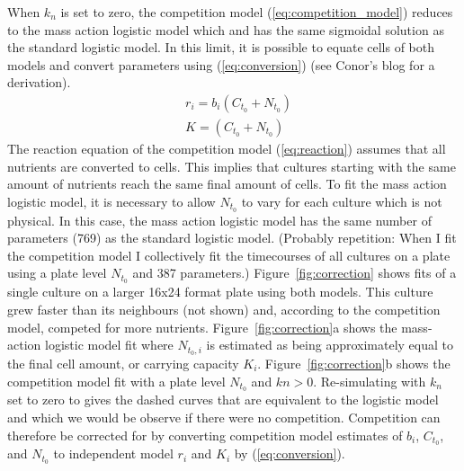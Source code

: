 When \(k_{n}\) is set to zero, the competition model
(\ref{eq:competition_model}) reduces to the mass action logistic model
which and has the same sigmoidal solution as the standard logistic
model. In this limit, it is possible to equate cells of both models
and convert parameters using (\ref{eq:conversion}) (see
Conor's blog for a derivation).
\begin{subequations}
  \label{eq:conversion}
  \begin{align}
    &r_{i} = b_{i}(C_{t_{0}} + N_{t_{0}})\\
    &K = (C_{t_{0}} + N_{t_{0}})
  \end{align}
\end{subequations}
%
The reaction equation of the competition model (\ref{eq:reaction})
assumes that all nutrients are converted to cells. This implies that
cultures starting with the same amount of nutrients reach the same
final amount of cells. To fit the mass action logistic model, it is
necessary to allow \(N_{t_{0}}\) to vary for each culture which is not
physical. In this case, the mass action logistic model has the same
number of parameters (769) as the standard logistic model. (Probably
repetition: When I fit the competition model I collectively fit the
timecourses of all cultures on a plate using a plate level
\(N_{t_{0}}\) and 387 parameters.)
%
Figure~\ref{fig:correction} shows fits of a single culture on a larger
16x24 format plate using both models. This culture grew faster than
its neighbours (not shown) and, according to the competition model,
competed for more nutrients.
%
Figure~\ref{fig:correction}a shows the mass-action logistic model fit
where \(N_{t_{0},i}\) is estimated as being approximately equal to the
final cell amount, or carrying capacity \(K_{i}\).
%
Figure~\ref{fig:correction}b shows the competition model fit with a
plate level \(N_{t_{0}}\) and \(kn > 0\). Re-simulating with \(k_{n}\)
set to zero to gives the dashed curves that are equivalent to the
logistic model and which we would be observe if there were no
competition. Competition can therefore be corrected for by converting
competition model estimates of \(b_{i}\), \(C_{t_{0}}\), and
\(N_{t_{0}}\) to independent model \(r_{i}\) and \(K_{i}\) by
(\ref{eq:conversion}).
%

